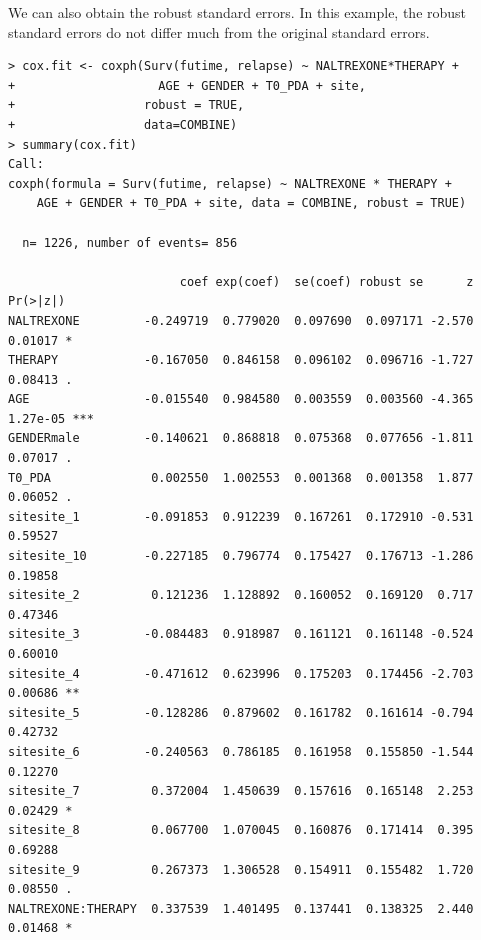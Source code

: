 We can also obtain the robust standard errors. In this example, the robust standard errors do not differ much from the original standard errors. 
\begin{lstlisting}
> cox.fit <- coxph(Surv(futime, relapse) ~ NALTREXONE*THERAPY + 
+                    AGE + GENDER + T0_PDA + site,
+                  robust = TRUE, 
+                  data=COMBINE)
> summary(cox.fit)
Call:
coxph(formula = Surv(futime, relapse) ~ NALTREXONE * THERAPY + 
    AGE + GENDER + T0_PDA + site, data = COMBINE, robust = TRUE)

  n= 1226, number of events= 856 

                        coef exp(coef)  se(coef) robust se      z Pr(>|z|)    
NALTREXONE         -0.249719  0.779020  0.097690  0.097171 -2.570  0.01017 *  
THERAPY            -0.167050  0.846158  0.096102  0.096716 -1.727  0.08413 .  
AGE                -0.015540  0.984580  0.003559  0.003560 -4.365 1.27e-05 ***
GENDERmale         -0.140621  0.868818  0.075368  0.077656 -1.811  0.07017 .  
T0_PDA              0.002550  1.002553  0.001368  0.001358  1.877  0.06052 .  
sitesite_1         -0.091853  0.912239  0.167261  0.172910 -0.531  0.59527    
sitesite_10        -0.227185  0.796774  0.175427  0.176713 -1.286  0.19858    
sitesite_2          0.121236  1.128892  0.160052  0.169120  0.717  0.47346    
sitesite_3         -0.084483  0.918987  0.161121  0.161148 -0.524  0.60010    
sitesite_4         -0.471612  0.623996  0.175203  0.174456 -2.703  0.00686 ** 
sitesite_5         -0.128286  0.879602  0.161782  0.161614 -0.794  0.42732    
sitesite_6         -0.240563  0.786185  0.161958  0.155850 -1.544  0.12270    
sitesite_7          0.372004  1.450639  0.157616  0.165148  2.253  0.02429 *  
sitesite_8          0.067700  1.070045  0.160876  0.171414  0.395  0.69288    
sitesite_9          0.267373  1.306528  0.154911  0.155482  1.720  0.08550 .  
NALTREXONE:THERAPY  0.337539  1.401495  0.137441  0.138325  2.440  0.01468 * 
\end{lstlisting}


